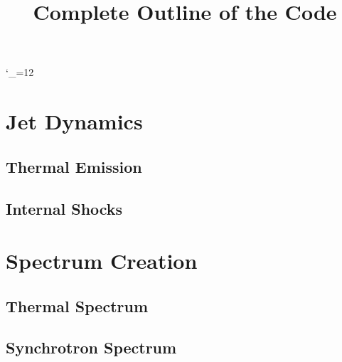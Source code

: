 \documentclass[10pt]{article}
\title{Complete Outline of the Code}
\def\upsubscripts{\catcode`\_=12 } \def\normalsubscripts{\catcode`\_=8 }
\begin{document}
\upsubscripts

\section{Jet Dynamics}



\subsection{Thermal Emission}
\subsection{Internal Shocks}


\section{Spectrum Creation}

\subsection{Thermal Spectrum}
\subsection{Synchrotron Spectrum}
\end{document}

